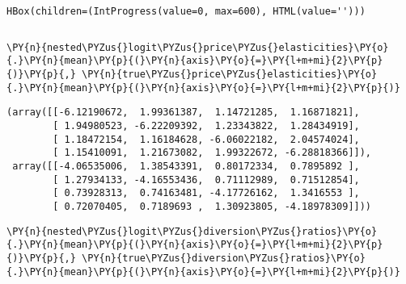     \begin{verbatim}
HBox(children=(IntProgress(value=0, max=600), HTML(value='')))
    \end{verbatim}


    \begin{Verbatim}[commandchars=\\\{\}]

    \end{Verbatim}

    \begin{tcolorbox}[breakable, size=fbox, boxrule=1pt, pad at break*=1mm,colback=cellbackground, colframe=cellborder]
\begin{Verbatim}[commandchars=\\\{\}]
\PY{n}{nested\PYZus{}logit\PYZus{}price\PYZus{}elasticities}\PY{o}{.}\PY{n}{mean}\PY{p}{(}\PY{n}{axis}\PY{o}{=}\PY{l+m+mi}{2}\PY{p}{)}\PY{p}{,} \PY{n}{true\PYZus{}price\PYZus{}elasticities}\PY{o}{.}\PY{n}{mean}\PY{p}{(}\PY{n}{axis}\PY{o}{=}\PY{l+m+mi}{2}\PY{p}{)}
\end{Verbatim}
\end{tcolorbox}

            \begin{tcolorbox}[breakable, size=fbox, boxrule=.5pt, pad at break*=1mm, opacityfill=0]
\begin{Verbatim}[commandchars=\\\{\}]
(array([[-6.12190672,  1.99361387,  1.14721285,  1.16871821],
        [ 1.94980523, -6.22209392,  1.23343822,  1.28434919],
        [ 1.18472154,  1.16184628, -6.06022182,  2.04574024],
        [ 1.15410091,  1.21673082,  1.99322672, -6.28818366]]),
 array([[-4.06535006,  1.38543391,  0.80172334,  0.7895892 ],
        [ 1.27934133, -4.16553436,  0.71112989,  0.71512854],
        [ 0.73928313,  0.74163481, -4.17726162,  1.3416553 ],
        [ 0.72070405,  0.7189693 ,  1.30923805, -4.18978309]]))
\end{Verbatim}
\end{tcolorbox}

    \begin{tcolorbox}[breakable, size=fbox, boxrule=1pt, pad at break*=1mm,colback=cellbackground, colframe=cellborder]
\begin{Verbatim}[commandchars=\\\{\}]
\PY{n}{nested\PYZus{}logit\PYZus{}diversion\PYZus{}ratios}\PY{o}{.}\PY{n}{mean}\PY{p}{(}\PY{n}{axis}\PY{o}{=}\PY{l+m+mi}{2}\PY{p}{)}\PY{p}{,} \PY{n}{true\PYZus{}diversion\PYZus{}ratios}\PY{o}{.}\PY{n}{mean}\PY{p}{(}\PY{n}{axis}\PY{o}{=}\PY{l+m+mi}{2}\PY{p}{)}
\end{Verbatim}
\end{tcolorbox}

